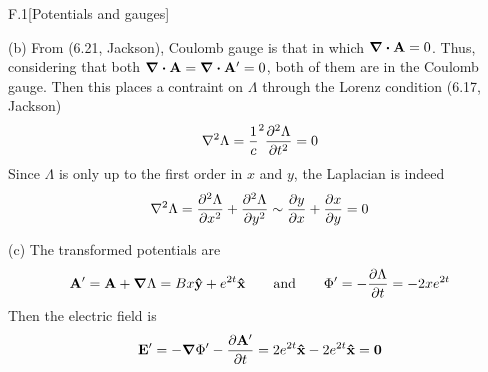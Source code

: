 \documentclass[12pt]{article}
\begin{document}
\begin{problem}{F.1}[Potentials and gauges]
\begin{solution}
(b) From (6.21, Jackson), Coulomb gauge is that in which $\div{\vb{A}}=0$.
Thus, considering that both $\div{\vb{A}}=\div{\vb{A}'}=0$, both of them are in
the Coulomb gauge. Then this places a contraint on $\Lambda$ through the Lorenz
condition (6.17, Jackson)
\begin{equation}
    \laplacian\Lambda=\frac1c^2\frac{\partial^2\Lambda}{\partial t^2}=0 
\end{equation}
Since $\Lambda$ is only up to the first order in $x$ and $y$, the Laplacian is
indeed
\begin{equation}
    \laplacian\Lambda=\frac{\partial^2\Lambda}{\partial
    x^2}+\frac{\partial^2\Lambda}{\partial y^2}
    \sim\frac{\partial y}{\partial x}+\frac{\partial x}{\partial y}=0
\end{equation}

(c) The transformed potentials are
\begin{equation}
    \vb{A}'=\vb{A}+\grad\Lambda=Bx\vb{\hat{y}}+e^{2t}\vb{\hat{x}}
    \qquad\text{and}\qquad
    \Phi'=-\frac{\partial\Lambda}{\partial t}=-2xe^{2t}
\end{equation}
Then the electric field is
\begin{equation}
    \vb{E}'=-\grad\Phi'-\frac{\partial\vb{A}'}{\partial
    t}=2e^{2t}\vb{\hat{x}}-2e^{2t}\vb{\hat{x}}=\vb{0}
\end{equation}
\end{solution}
\end{problem}
\end{document}
